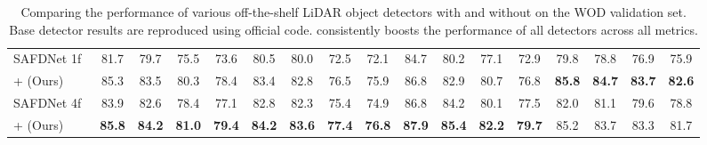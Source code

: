 \begin{table}[t]
\begin{tabular}{@{}lcccccccccccccccc@{}}
    SAFDNet 1f~\cite{safdnet}          & 81.7          & 79.7 & 75.5 & 73.6 & 80.5          & 80.0 & 72.5 & 72.1 & 84.7 & 80.2 & 77.1 & 72.9 & 79.8 & 78.8 & 76.9 & 75.9 \\
    \rowcolor{tablecolor}
    + \ourmodel{} (Ours)               & 85.3 & 83.5 & 80.3 & 78.4 & 83.4 & 82.8 & 76.5 & 75.9 & 86.8 & 82.9 & 80.7 & 76.8 & \textbf{85.8} & \textbf{84.7} & \textbf{83.7} & \textbf{82.6} \\ \midrule
    SAFDNet 4f~\cite{safdnet}          & 83.9          & 82.6 & 78.4 & 77.1 & 82.8          & 82.3 & 75.4 & 74.9 & 86.8 & 84.2 & 80.1 & 77.5 & 82.0 & 81.1 & 79.6 & 78.8 \\
    \rowcolor{tablecolor}
    + \ourmodel{} (Ours)          & \textbf{85.8} & \textbf{84.2} & \textbf{81.0} & \textbf{79.4} & \textbf{84.2} & \textbf{83.6} & \textbf{77.4} & \textbf{76.8} & \textbf{87.9} & \textbf{85.4} & \textbf{82.2} & \textbf{79.7} & 85.2 & 83.7 & 83.3 & 81.7 \\ \bottomrule
    \end{tabular}
    \caption{
        Comparing the performance of various off-the-shelf LiDAR object detectors with and without \ourmodel{} on the WOD validation set. 
        Base detector results are reproduced using official code. \ourmodel{} consistently boosts the performance of all detectors across all metrics.
    }
    \label{tab:main-table-wod}
\end{table}